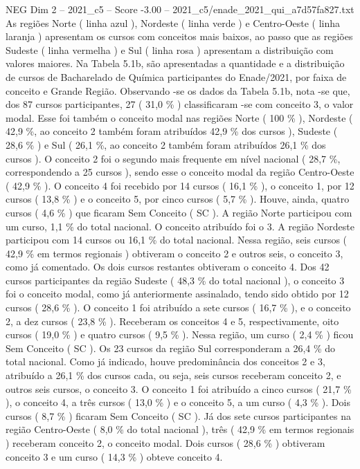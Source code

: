 \begin{textsample}{NEG Dim 2 – 2021\_c5 – Score -3.00 – 2021\_c5/enade\_2021\_qui\_a7d57fa827.txt}
As regiões Norte ( linha azul ), Nordeste ( linha verde ) e Centro-Oeste ( linha laranja ) apresentam os cursos com conceitos mais baixos, ao passo que as regiões Sudeste ( linha vermelha ) e Sul ( linha rosa ) apresentam a distribuição com valores maiores.
Na Tabela 5.1b, são apresentadas a quantidade e a distribuição de cursos de Bacharelado de Química participantes do Enade/2021, por faixa de conceito e Grande Região.
Observando -se os dados da Tabela 5.1b, nota -se que, dos 87 cursos participantes, 27 ( 31,0 \% ) classificaram -se com conceito 3, o valor modal.
Esse foi também o conceito modal nas regiões Norte ( 100 \% ), Nordeste ( 42,9 \%, ao conceito 2 também foram atribuídos 42,9 \% dos cursos ), Sudeste ( 28,6 \% ) e Sul ( 26,1 \%, ao conceito 2 também foram atribuídos 26,1 \% dos cursos ).
O conceito 2 foi o segundo mais frequente em nível nacional ( 28,7 \%, correspondendo a 25 cursos ), sendo esse o conceito modal da região Centro-Oeste ( 42,9 \% ).
O conceito 4 foi recebido por 14 cursos ( 16,1 \% ), o conceito 1, por 12 cursos ( 13,8 \% ) e o conceito 5, por cinco cursos ( 5,7 \% ).
Houve, ainda, quatro cursos ( 4,6 \% ) que ficaram Sem Conceito ( SC ).
A região Norte participou com um curso, 1,1 \% do total nacional.
O conceito atribuído foi o 3.
A região Nordeste participou com 14 cursos ou 16,1 \% do total nacional.
Nessa região, seis cursos ( 42,9 \% em termos regionais ) obtiveram o conceito 2 e outros seis, o conceito 3, como já comentado.
Os dois cursos restantes obtiveram o conceito 4.
Dos 42 cursos participantes da região Sudeste ( 48,3 \% do total nacional ), o conceito 3 foi o conceito modal, como já anteriormente assinalado, tendo sido obtido por 12 cursos ( 28,6 \% ).
O conceito 1 foi atribuído a sete cursos ( 16,7 \% ), e o conceito 2, a dez cursos ( 23,8 \% ).
Receberam os conceitos 4 e 5, respectivamente, oito cursos ( 19,0 \% ) e quatro cursos ( 9,5 \% ).
Nessa região, um curso ( 2,4 \% ) ficou Sem Conceito ( SC ).
Os 23 cursos da região Sul corresponderam a 26,4 \% do total nacional.
Como já indicado, houve predominância dos conceitos 2 e 3, atribuído a 26,1 \% dos cursos cada, ou seja, seis cursos receberam conceito 2, e outros seis cursos, o conceito 3.
O conceito 1 foi atribuído a cinco cursos ( 21,7 \% ), o conceito 4, a três cursos ( 13,0 \% ) e o conceito 5, a um curso ( 4,3 \% ).
Dois cursos ( 8,7 \% ) ficaram Sem Conceito ( SC ).
Já dos sete cursos participantes na região Centro-Oeste ( 8,0 \% do total nacional ), três ( 42,9 \% em termos regionais ) receberam conceito 2, o conceito modal.
Dois cursos ( 28,6 \% ) obtiveram conceito 3 e um curso ( 14,3 \% ) obteve conceito 4.

\end{textsample}
